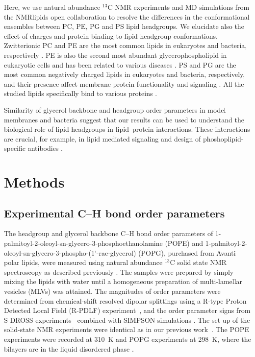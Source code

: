 \documentclass[aps,prl,superscriptaddress,twocolumn]{revtex4}
\begin{document}
Here, we use natural abundance $^{13}$C NMR experiments %
and MD simulations from the NMRlipids open collaboration
to resolve the differences in the conformational ensembles between PC, PE, PG and PS lipid headgroups.
We elucidate also the effect of charges and protein binding to lipid headgroup conformations.
Zwitterionic PC and PE are the most common lipids in eukaryotes and bacteria, respectively \cite{vanmeer08,sohlenkamp16}.
PE is also the second most abundant glycerophospholipid in eukaryotic cells
and has been related to various diseases \cite{vance15,calzada16,patel17}.
PS and PG are the most common negatively charged lipids in eukaryotes and bacteria, respectively,
and their presence affect membrane protein functionality and signaling \cite{lemmon08,leventis10,sohlenkamp16,hariharan18}.
All the studied lipids specifically bind to various proteins \cite{yeagle14}.

Similarity of glycerol backbone and headgroup order parameters in model membranes and bacteria \cite{gally81,scherer87,seelig90}
suggest that our results can be used to 
understand the biological role of lipid headgroups in lipid--protein interactions.
These interactions are crucial, for example, in lipid mediated signaling \cite{lemmon08} and
design of phoshoplipid-specific antibodies \cite{vigant15}. 


\section{Methods}
\subsection{Experimental C--H bond order parameters}
The headgroup and glycerol backbone C--H bond order parameters of 1-palmitoyl-2-oleoyl-sn-glycero-3-phosphoethanolamine (POPE) and 1-palmitoyl-2-oleoyl-sn-glycero-3-phospho-(1'-rac-glycerol) (POPG), purchased from Avanti polar lipids, were measured using natural abundance $^{13}$C solid state NMR spectroscopy as described previously \cite{ferreira13,ferreira16}. The samples were prepared by simply mixing the lipids with water until a homogeneous preparation of multi-lamellar vesicles (MLVs) was attained. The magnitudes of order parameters were determined from chemical-shift resolved dipolar splittings using a R-type Proton Detected Local Field (R-PDLF) experiment~\cite{dvinskikh04}, and the order parameter signs from S-DROSS experiments~\cite{gross97} combined with SIMPSON simulations \cite{bak00}.
The set-up of the solid-state NMR experiments were identical as in our previous work~\cite{antila19}. The POPE experiments were recorded at 310~K and POPG experiments at 298~K, where the bilayers are in the liquid disordered phase \cite{marsh13}.
\end{document}
